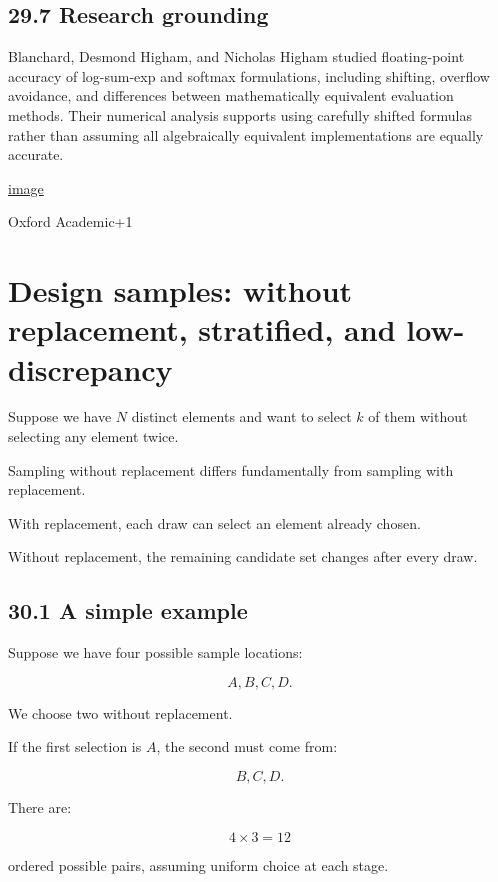 \subsection{29.7 Research grounding}\label{02-foundations-ii-ch031-research-grounding}

Blanchard, Desmond Higham, and Nicholas Higham studied floating-point accuracy of log-sum-exp and softmax formulations, including shifting, overflow avoidance, and differences between mathematically equivalent evaluation methods. Their numerical analysis supports using carefully shifted formulas rather than assuming all algebraically equivalent implementations are equally accurate. 

\href{https://www.google.com/s2/favicons?domain=https://academic.oup.com&sz=32}{image}

Oxford Academic+1

\section{Design samples: without replacement, stratified, and low-discrepancy}\label{02-foundations-ii-ch031-design-samples-without-replacement-stratified-and-low-discrepancy}

Suppose we have \(N\) distinct elements and want to select \(k\) of them without selecting any element twice.

Sampling without replacement differs fundamentally from sampling with replacement.

With replacement, each draw can select an element already chosen.

Without replacement, the remaining candidate set changes after every draw.

\subsection{30.1 A simple example}\label{02-foundations-ii-ch031-a-simple-example}

Suppose we have four possible sample locations:

\[ A,B,C,D. \]

We choose two without replacement.

If the first selection is \(A\), the second must come from:

\[ B,C,D. \]

There are:

\[ 4\times3=12 \]

ordered possible pairs, assuming uniform choice at each stage.

